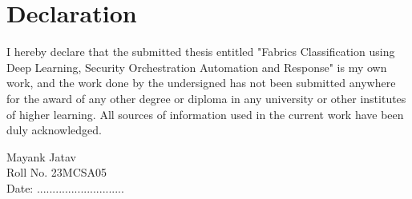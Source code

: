 
\chapter*{Declaration}
\thispagestyle{empty}


\vspace{1cm}
\nohyphens{I hereby declare that the submitted thesis entitled "Fabrics Classification using Deep Learning, Security Orchestration Automation and Response" is my own work, and the work done by the undersigned has not been submitted anywhere for the award of any other degree or diploma in any university or other institutes of higher learning. All sources of information used in the current work have been duly acknowledged.
}


\vspace*{3cm}
\begin{flushright}
    
	Mayank Jatav	\\
	\vspace*{0.2cm}
        Roll No. 23MCSA05\\
	 Date: ............................

\end{flushright}


